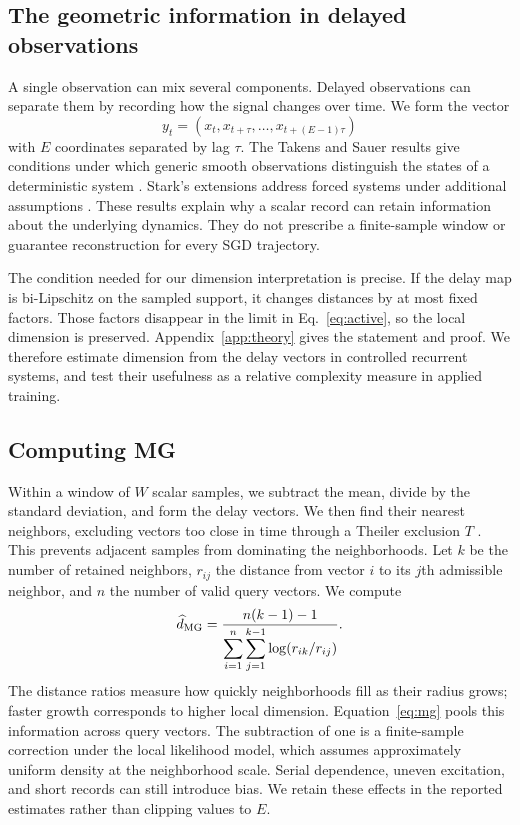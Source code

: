 {\subsection{The geometric information in delayed observations}
A single observation can mix several components. Delayed observations can separate them by recording how the signal changes over time. We form the vector
\begin{equation}
y_t=(x_t,x_{t+\tau},\ldots,x_{t+(E-1)\tau})
\label{eq:delay}
\end{equation}
with $E$ coordinates separated by lag $\tau$. The Takens and Sauer results give conditions under which generic smooth observations distinguish the states of a deterministic system \citep{takens1981detecting,sauer1991embedology}. Stark's extensions address forced systems under additional assumptions \citep{stark1999delay,stark2003delay}. These results explain why a scalar record can retain information about the underlying dynamics. They do not prescribe a finite-sample window or guarantee reconstruction for every SGD trajectory.

The condition needed for our dimension interpretation is precise. If the delay map is bi-Lipschitz on the sampled support, it changes distances by at most fixed factors. Those factors disappear in the limit in Eq.~\eqref{eq:active}, so the local dimension is preserved. Appendix~\ref{app:theory} gives the statement and proof. We therefore estimate dimension from the delay vectors in controlled recurrent systems, and test their usefulness as a relative complexity measure in applied training.

\subsection{Computing MG}
Within a window of $W$ scalar samples, we subtract the mean, divide by the standard deviation, and form the delay vectors. We then find their nearest neighbors, excluding vectors too close in time through a Theiler exclusion $T$ \citep{theiler1986spurious}. This prevents adjacent samples from dominating the neighborhoods. Let $k$ be the number of retained neighbors, $r_{ij}$ the distance from vector $i$ to its $j$th admissible neighbor, and $n$ the number of valid query vectors. We compute
\begin{equation}
\widehat d_{\mathrm{MG}}=\frac{n(k-1)-1}
{\displaystyle\sum_{i=1}^{n}\sum_{j=1}^{k-1}
\log(r_{ik}/r_{ij})}.
\label{eq:mg}
\end{equation}
The distance ratios measure how quickly neighborhoods fill as their radius grows; faster growth corresponds to higher local dimension. Equation~\eqref{eq:mg} pools this information across query vectors. The subtraction of one is a finite-sample correction under the local likelihood model, which assumes approximately uniform density at the neighborhood scale. Serial dependence, uneven excitation, and short records can still introduce bias. We retain these effects in the reported estimates rather than clipping values to $E$.

}
